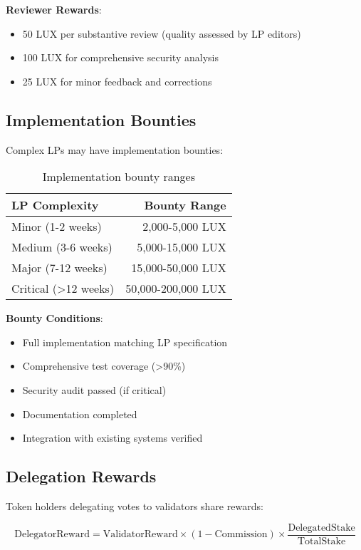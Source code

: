 \documentclass[11pt,a4paper]{article}
\begin{document}
\textbf{Reviewer Rewards}:
\begin{itemize}
\item 50 LUX per substantive review (quality assessed by LP editors)
\item 100 LUX for comprehensive security analysis
\item 25 LUX for minor feedback and corrections
\end{itemize}

\subsection{Implementation Bounties}

Complex LPs may have implementation bounties:

\begin{table}[h]
\centering
\begin{tabular}{@{}lr@{}}
\toprule
\textbf{LP Complexity} & \textbf{Bounty Range} \\ \midrule
Minor (1-2 weeks) & 2,000-5,000 LUX \\
Medium (3-6 weeks) & 5,000-15,000 LUX \\
Major (7-12 weeks) & 15,000-50,000 LUX \\
Critical (>12 weeks) & 50,000-200,000 LUX \\ \bottomrule
\end{tabular}
\caption{Implementation bounty ranges}
\end{table}

\textbf{Bounty Conditions}:
\begin{itemize}
\item Full implementation matching LP specification
\item Comprehensive test coverage (>90\%)
\item Security audit passed (if critical)
\item Documentation completed
\item Integration with existing systems verified
\end{itemize}

\subsection{Delegation Rewards}

Token holders delegating votes to validators share rewards:

\begin{equation}
\text{DelegatorReward} = \text{ValidatorReward} \times (1 - \text{Commission}) \times \frac{\text{DelegatedStake}}{\text{TotalStake}}
\end{equation}
\end{document}
